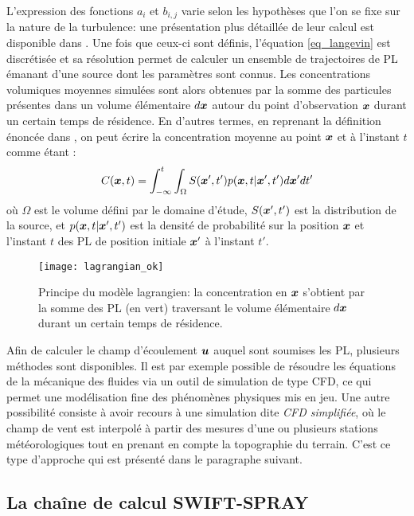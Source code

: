 L'expression des fonctions $a_i$ et $b_{i,j}$ varie selon les hypothèses que l'on se fixe sur la nature de la turbulence: une présentation plus détaillée de leur calcul est disponible dans \cite{Wilson1996}. Une fois que ceux-ci sont définis, l'équation \eqref{eq_langevin} est discrétisée et sa résolution permet de calculer un ensemble de trajectoires de PL émanant d'une source dont les paramètres sont connus. Les concentrations volumiques moyennes simulées sont alors obtenues par la somme des particules présentes dans un volume élémentaire $d{\bm{x}}$ autour du point d'observation ${\bm{x}}$ durant un certain temps de résidence. En d'autres termes, en reprenant la définition énoncée dans \cite{Flesch1995}, on peut écrire la concentration moyenne au point ${\bm{x}}$ et à l'instant $t$ comme étant : 
\begin{equation}
	C({\bm{x}}, t) = \int _{-\infty}^{t} \int_{\Omega} S({\bm{x}}',t')p({\bm{x}}, t | {\bm{x}}', t')d{\bm{x}}'dt'
	\label{eq_c_moyen_lagrangien}
\end{equation}
où $\Omega$ est le volume défini par le domaine d'étude, $S({\bm{x}}',t')$ est la distribution de la source, et $p({\bm{x}}, t | {\bm{x}}', t')$ est la densité de probabilité sur la position ${\bm{x}}$ et l'instant $t$ des PL de position initiale ${\bm{x}}'$ à l'instant $t'$. \\

\begin{figure}
	\centering
	\texttt{[image: lagrangian\_ok]}
	\caption{Principe du modèle lagrangien: la concentration en ${\bm{x}}$ s'obtient par la somme des PL (en vert) traversant le volume élémentaire $d{\bm{x}}$ durant un certain temps de résidence.}
	\label{fig_schema_lagrangien}
\end{figure}

Afin de calculer le champ d'écoulement {${\bm{u}}$} auquel sont soumises les PL, plusieurs méthodes sont disponibles. Il est par exemple possible de résoudre les équations de la mécanique des fluides via un outil de simulation de type CFD, ce qui permet une modélisation fine des phénomènes physiques mis en jeu. Une autre possibilité consiste à avoir recours à une simulation dite \textit{CFD simplifiée}, où le champ de vent est interpolé à partir des mesures d'une ou plusieurs stations météorologiques tout en prenant en compte la topographie du terrain. C'est {ce type d'approche qui est présenté dans le paragraphe suivant.}

\subsection{La chaîne de calcul SWIFT-SPRAY}

